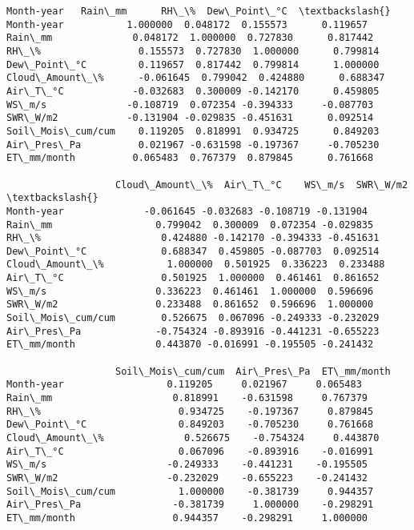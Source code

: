 \documentclass[11pt]{article}
\makeatletter
\newcommand{\boxspacing}{\kern\kvtcb@left@rule\kern\kvtcb@boxsep}
\newcommand{\prompt}[4]{
        {\ttfamily\llap{{\color{#2}[#3]:\hspace{3pt}#4}}\vspace{-\baselineskip}}
    }
\makeatother
\begin{document}
            \begin{tcolorbox}[breakable, size=fbox, boxrule=.5pt, pad at break*=1mm, opacityfill=0]
\prompt{Out}{outcolor}{9}{\boxspacing}
\begin{Verbatim}[commandchars=\\\{\}]
                   Month-year   Rain\_mm      RH\_\%  Dew\_Point\_°C  \textbackslash{}
Month-year           1.000000  0.048172  0.155573      0.119657
Rain\_mm              0.048172  1.000000  0.727830      0.817442
RH\_\%                 0.155573  0.727830  1.000000      0.799814
Dew\_Point\_°C         0.119657  0.817442  0.799814      1.000000
Cloud\_Amount\_\%      -0.061645  0.799042  0.424880      0.688347
Air\_T\_°C            -0.032683  0.300009 -0.142170      0.459805
WS\_m/s              -0.108719  0.072354 -0.394333     -0.087703
SWR\_W/m2            -0.131904 -0.029835 -0.451631      0.092514
Soil\_Mois\_cum/cum    0.119205  0.818991  0.934725      0.849203
Air\_Pres\_Pa          0.021967 -0.631598 -0.197367     -0.705230
ET\_mm/month          0.065483  0.767379  0.879845      0.761668

                   Cloud\_Amount\_\%  Air\_T\_°C    WS\_m/s  SWR\_W/m2  \textbackslash{}
Month-year              -0.061645 -0.032683 -0.108719 -0.131904
Rain\_mm                  0.799042  0.300009  0.072354 -0.029835
RH\_\%                     0.424880 -0.142170 -0.394333 -0.451631
Dew\_Point\_°C             0.688347  0.459805 -0.087703  0.092514
Cloud\_Amount\_\%           1.000000  0.501925  0.336223  0.233488
Air\_T\_°C                 0.501925  1.000000  0.461461  0.861652
WS\_m/s                   0.336223  0.461461  1.000000  0.596696
SWR\_W/m2                 0.233488  0.861652  0.596696  1.000000
Soil\_Mois\_cum/cum        0.526675  0.067096 -0.249333 -0.232029
Air\_Pres\_Pa             -0.754324 -0.893916 -0.441231 -0.655223
ET\_mm/month              0.443870 -0.016991 -0.195505 -0.241432

                   Soil\_Mois\_cum/cum  Air\_Pres\_Pa  ET\_mm/month
Month-year                  0.119205     0.021967     0.065483
Rain\_mm                     0.818991    -0.631598     0.767379
RH\_\%                        0.934725    -0.197367     0.879845
Dew\_Point\_°C                0.849203    -0.705230     0.761668
Cloud\_Amount\_\%              0.526675    -0.754324     0.443870
Air\_T\_°C                    0.067096    -0.893916    -0.016991
WS\_m/s                     -0.249333    -0.441231    -0.195505
SWR\_W/m2                   -0.232029    -0.655223    -0.241432
Soil\_Mois\_cum/cum           1.000000    -0.381739     0.944357
Air\_Pres\_Pa                -0.381739     1.000000    -0.298291
ET\_mm/month                 0.944357    -0.298291     1.000000
\end{Verbatim}
\end{tcolorbox}
        
\end{document}
